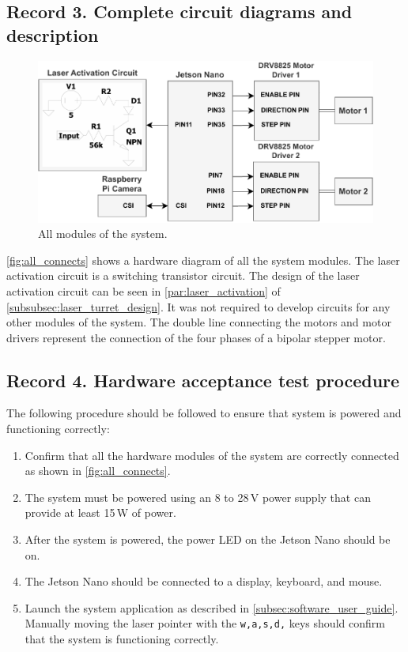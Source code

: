 \newpage
\subsection{Record 3. Complete circuit diagrams and description}
\begin{figure}[h]
  \centering
  \includegraphics[width=\textwidth]{figures/all_system_connects.pdf}
  \caption{All modules of the system.}
  \label{fig:all_connects}
\end{figure}
\autoref{fig:all_connects} shows a hardware diagram of all the system modules. The laser activation circuit is a switching transistor circuit. The design of the laser activation circuit can be seen in \autoref{par:laser_activation} of \autoref{subsubsec:laser_turret_design}. It was not required to develop circuits for any other modules of the system. The double line connecting the motors and motor drivers represent the connection of the four phases of a bipolar stepper motor.

\newpage
\subsection{Record 4. Hardware acceptance test procedure}
The following procedure should be followed to ensure that system is powered and functioning correctly:
\begin{enumerate}
  \item Confirm that all the hardware modules of the system are correctly connected as shown in \autoref{fig:all_connects}.
  \item The system must be powered using an 8 to 28\,V power supply that can provide at least 15\,W of power.
  \item After the system is powered, the power LED on the Jetson Nano should be on.
  \item The Jetson Nano should be connected to a display, keyboard, and mouse.
  \item Launch the system application as described in \autoref{subsec:software_user_guide}. Manually moving the laser pointer with the \texttt{w,a,s,d,} keys should confirm that the system is functioning correctly.
\end{enumerate}

